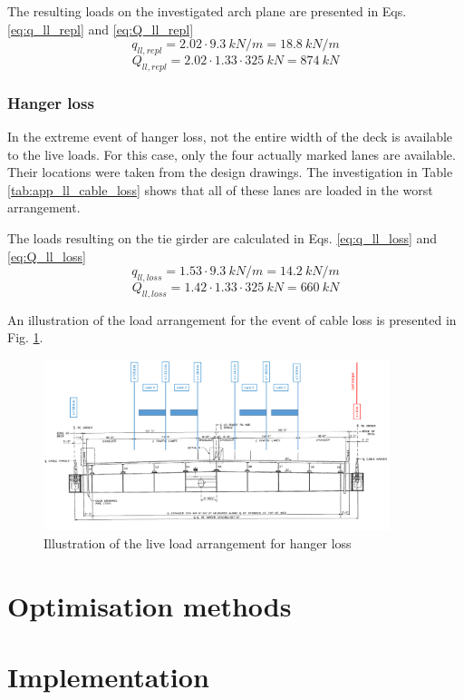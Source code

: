 The resulting loads on the investigated arch plane are presented in Eqs. \eqref{eq:q_ll_repl} and \eqref{eq:Q_ll_repl}
\begin{equation}
    q_{ll, repl} = 2.02 \cdot \SI{9.3}{kN/m} = \SI{18.8}{kN/m}
    \label{eq:q_ll_repl}
\end{equation}
\begin{equation}
    Q_{ll, repl} = 2.02 \cdot 1.33 \cdot \SI{325}{kN} = \SI{874}{kN}
    \label{eq:Q_ll_repl}
\end{equation}

\newpage
\subsubsection{Hanger loss} \label{Appendx_A_Live_loading_3}
In the extreme event of hanger loss, not the entire width of the deck is available to the live loads. For this case, only the four actually marked lanes are available. Their locations were taken from the design drawings. The investigation in Table \ref{tab:app_ll_cable_loss} shows that all of these lanes are loaded in the worst arrangement.


The loads resulting on the tie girder are calculated in Eqs. \eqref{eq:q_ll_loss} and \eqref{eq:Q_ll_loss}
\begin{equation}
    q_{ll, loss} = 1.53 \cdot \SI{9.3}{kN/m} = \SI{14.2}{kN/m}
    \label{eq:q_ll_loss}
\end{equation}
\begin{equation}
    Q_{ll, loss} = 1.42 \cdot 1.33 \cdot \SI{325}{kN} = \SI{660}{kN}
    \label{eq:Q_ll_loss}
\end{equation}

An illustration of the load arrangement for the event of cable loss is presented in Fig. \ref{fig:app_hangers_cable_loss}.

\begin{figure}[H]
    \centering
    \includegraphics[width=0.9\textwidth]{overleaf/Appendix/Pictures/Cross_Section_LL_Cable Loss.PNG}
    \caption{Illustration of the live load arrangement for hanger loss}
    \label{fig:app_hangers_cable_loss}
\end{figure}

\section{Optimisation methods}

\section{Implementation}

